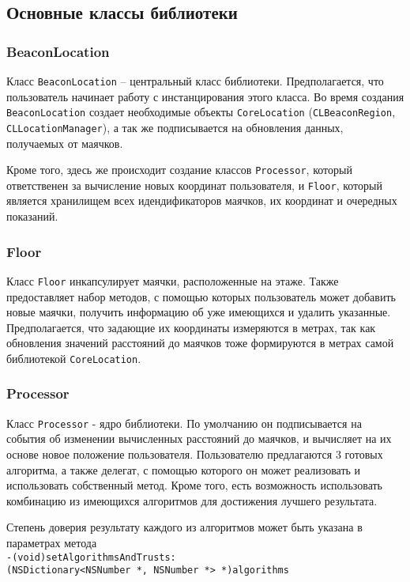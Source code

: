\subsection{Основные классы библиотеки}

\subsubsection{BeaconLocation}

Класс \texttt{BeaconLocation} – центральный класс библиотеки. Предполагается, что пользователь начинает работу с инстанцирования этого класса. Во время создания \texttt{BeaconLocation} создает необходимые объекты \texttt{CoreLocation} (\texttt{CLBeaconRegion}, \texttt{CLLocationManager}), а так же подписывается на обновления данных, получаемых от маячков.

Кроме того, здесь же происходит создание классов \texttt{Processor}, который ответственен за вычисление новых координат пользователя, и \texttt{Floor}, который является хранилищем всех идендификаторов маячков, их координат и очередных показаний.

\subsubsection{Floor}

Класс \texttt{Floor} инкапсулирует маячки, расположенные на этаже. Также пре\-до\-став\-ляет набор методов, с помощью которых пользователь может добавить новые маячки, получить информацию об уже имеющихся и удалить указанные. Предполагается, что задающие их координаты измеряются в метрах, так как обновления значений расстояний до маячков тоже формируются в метрах самой библиотекой \texttt{CoreLocation}.

\subsubsection{Processor}

Класс \texttt{Processor} - ядро библиотеки. По умолчанию он подписывается на события об изменении вычисленных расстояний до маячков, и вычисляет на их основе новое положение пользователя. 
Пользователю предлагаются 3 готовых алгоритма, а также делегат, с помощью которого он может реализовать и использовать собственный метод. Кроме того, есть возможность использовать комбинацию из имеющихся алгоритмов для достижения лучшего результата.

Степень доверия результату каждого из алгоритмов может быть указана в параметрах метода \\ \texttt{-(void)setAlgorithmsAndTrusts:\\(NSDictionary<NSNumber *, NSNumber *> *)algorithms}

